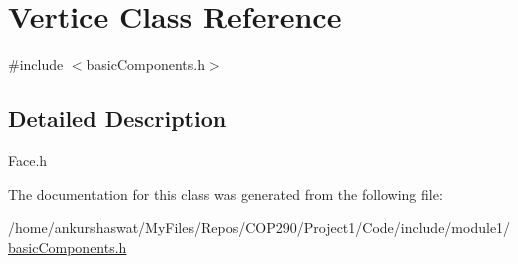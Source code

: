 \hypertarget{classVertice}{}\section{Vertice Class Reference}
\label{classVertice}


{\ttfamily \#include $<$basic\+Components.\+h$>$}



\subsection{Detailed Description}
Face.\+h 

The documentation for this class was generated from the following file\+:\begin{DoxyCompactItemize}
\item 
/home/ankurshaswat/\+My\+Files/\+Repos/\+C\+O\+P290/\+Project1/\+Code/include/module1/\hyperlink{basicComponents_8h}{basic\+Components.\+h}\end{DoxyCompactItemize}
